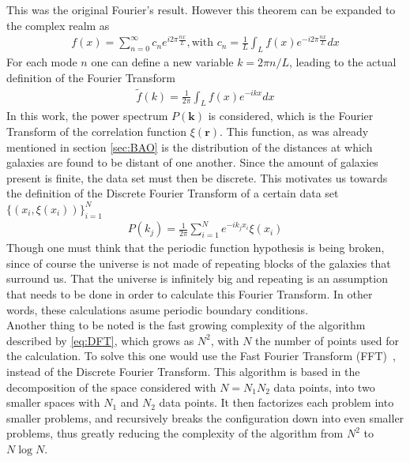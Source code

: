 This was the original Fourier's result. However this theorem can be expanded to the complex realm as 
\begin{align}
	f(x) = \sum_{n=0}^{\infty} c_n e^{i 2\pi \frac{nx}{L}}, \text{with } c_n = \frac{1}{L}\int_{L}^{} f(x) e^{-i 2\pi \frac{nx}{L}}dx 
\end{align}
For each mode $n$ one can define a new variable $k=2\pi n /L$, leading to the actual definition of the Fourier Transform 
\begin{align}
	\tilde{f}(k) = \frac{1}{2\pi}\int_{L}^{}  f(x) e^{-i k x} dx
\end{align}
In this work, the power spectrum $P(\textbf{k})$ is considered, which is the Fourier Transform of the correlation function $\xi(\textbf{r})$. This function, as was already mentioned in section \ref{sec:BAO} is the distribution of the distances at which galaxies are found to be distant of one another. Since the amount of galaxies present is finite, the data set must then be discrete. This motivates us towards the definition of the Discrete Fourier Transform of a certain data set $\{\left( x_i, \xi(x_i) \right) \}_{i=1}^{N} $
\begin{align}
	P(k_j) = \frac{1}{2\pi}\sum_{i=1}^{N} e^{-i k_j x_{i}} \xi(x_i)
	\label{eq:DFT}
\end{align}
Though one must think that the periodic function hypothesis is being broken, since of course the universe is not made of repeating blocks of the galaxies that surround us. That the universe is infinitely big and repeating is an assumption that needs to be done in order to calculate this Fourier Transform. In other words, these calculations asume periodic boundary conditions.\\


Another thing to be noted is the fast growing complexity of the algorithm described by \eqref{eq:DFT}, which grows as $N^2$, with $N$ the number of points used for the calculation. 
To solve this one would use the Fast Fourier Transform (FFT)~\cite{FFT}, instead of the Discrete Fourier Transform. This algorithm is based in the decomposition of the space considered with $N=N_1N_2$ data points, into two smaller spaces with $N_1$ and $N_2$ data points. It then factorizes each problem into smaller problems, and recursively breaks the configuration down into even smaller problems, thus greatly reducing the complexity of the algorithm from $N^2$ to $N\log N$.  \\

